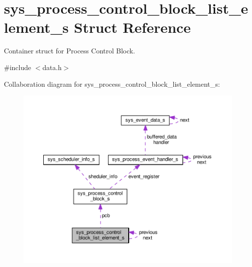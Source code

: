 \hypertarget{structsys__process__control__block__list__element__s}{}\section{sys\+\_\+process\+\_\+control\+\_\+block\+\_\+list\+\_\+element\+\_\+s Struct Reference}
\label{structsys__process__control__block__list__element__s}


Container struct for Process Control Block.  




{\ttfamily \#include $<$data.\+h$>$}



Collaboration diagram for sys\+\_\+process\+\_\+control\+\_\+block\+\_\+list\+\_\+element\+\_\+s\+:\nopagebreak
\begin{figure}[H]
\begin{center}
\leavevmode
\includegraphics[width=350pt]{de/d98/structsys__process__control__block__list__element__s__coll__graph}
\end{center}
\end{figure}
